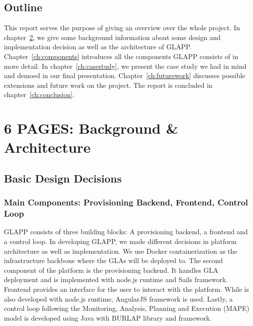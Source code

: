 \documentclass{seal_thesis}
\begin{document}
\section{Outline}
This report serves the purpose of giving an overview over the whole project.
In chapter~\ref{ch:background}, we give some background information about some design and implementation decision as well as the architecture of GLAPP.
Chapter~\ref{ch:components} introduces all the components GLAPP consists of in more detail.
In chapter~\ref{ch:casestudy}, we present the case study we had in mind and demoed in our final presentation.
Chapter~\ref{ch:futurework} discusses possible extensions and future work on the project.
The report is concluded in chapter~\ref{ch:conclusion}.



\chapter{6 PAGES: Background \& Architecture}\label{ch:background}

\section{Basic Design Decisions}

\subsection{Main Components: Provisioning Backend, Frontend, Control Loop}
GLAPP consists of three building blocks: A provisioning backend, a frontend and a control loop.
In developing GLAPP, we made different decisions in platform architecture as well as implementation.
We use Docker containerization as the infrastructure backbone where the GLAs will be deployed to.
The second component of the platform is the provisioning backend.
It handles GLA deployment and is implemented with node.js runtime and Sails framework.
Frontend provides an interface for the user to interact with the platform.
While is also developed with node.js runtime, AngularJS framework is used.
Lastly, a control loop following the Monitoring, Analysis, Planning and Execution (MAPE) model is developed using Java with BURLAP library and framework.
\end{document}
